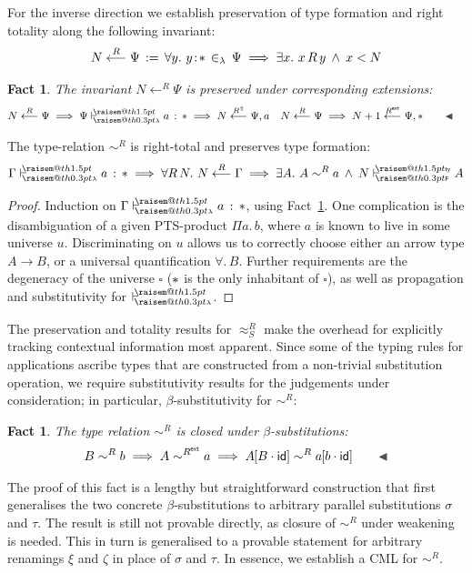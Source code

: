 \documentclass[a4paper,UKenglish]{lipics-v2016}
\makeatletter
\newcommand{\ms}{\,}
\newcommand{\mrel}[1]{\mathrel{\ms #1 \ms}}
\newcommand{\OF}{\mrel{:}}
\newcommand{\mAnd}{\mrel{\wedge}}
\newcommand{\mAll}[1]{\ensuremath{\forall} #1.\ms\ms}
\newcommand{\mEx}[1]{\ensuremath{\exists} #1.\ms\ms}
\newcommand{\eqdef}{\mrel{:=}}
\newcommand{\ty}{\mathsf{ty}}
\newcommand{\of}{\ensuremath{\!:\!}}
\newcommand{\raisemath}[1]{\mathpalette{\raisem@th{#1}}}
\newcommand{\raisem@th}[3]{\raisebox{#1}{\ensuremath{#2#3}}}
\newcommand{\tsAnnot}[2]{\vdash\hspace{-.7em}^{\raisemath{1.5pt}{\scriptscriptstyle{#2}}}_{\raisemath{0.3pt}{\scriptscriptstyle{#1}}}} %
\newcommand{\tfF}{\tsAnnot{\mathsf{F}}{\ty}}  %
\newcommand{\istyF}[2]{\ensuremath{{#1} \mathrel{\tfF} #2}}
\newcommand{\tyL}{\tsAnnot{\lambda}{}} %
\newcommand{\typingL}[3]{\ensuremath{{#1} \mathrel{\tyL} #2 \OF #3}}
\newcommand{\inL}{\mrel{\in_{\lambda}}}
\newcommand{\tyr}{\mathrel{\sim}}
\newcommand{\tmr}{\mathrel{\approx}}
\newcommand{\Rext}[1]{\ensuremath{#1^{\mathsf{ext}}}}
\newcommand{\Rshift}[1]{\ensuremath{#1^{\Uparrow}}}
\newcommand{\tyctxrelLF}[3]{\ensuremath{#1\mathrel{\mathop{\longleftarrow}^{#2}\limits}#3}}
\newcommand{\Prp}{\ensuremath{\textrm{\textasteriskcentered}}}
\newcommand{\Typ}{\ensuremath{\square}}
\newcommand{\All}{\ensuremath{\forall.\,}}
\newcommand{\Prod}[1]{\ensuremath{\Pi #1.\,}}
\newcommand{\subst}[1]{\hphantom{|}\!\![{#1}]}
\newcommand{\scons}{\mathbin{\cdot}}
\newcommand{\id}{\mathsf{id}}
\theoremstyle{plain}
\newtheorem{fact}[theorem]{Fact}
\makeatother
\begin{document}
For the inverse direction we establish preservation of type formation and right totality along the following invariant:
\begin{align*}
  \tyctxrelLF{N}{R}{\Psi} \eqdef \mAll {y} y\of\Prp \inL \Psi \implies \mEx x x\,R\,y \mAnd x < N
\end{align*}
\begin{fact}
  \label{fac:inv-tylf-ext}
  The invariant $\tyctxrelLF{N}{R}{\Psi}$ is preserved under corresponding extensions:
  \begin{align*}
    &\tyctxrelLF{N}{R}{\Psi} \implies \typingL{\Psi}{a}{\Prp} \implies \tyctxrelLF{N}{\Rshift{R}}{\Psi,a} & &\tyctxrelLF{N}{R}{\Psi} \implies \tyctxrelLF{N+1}{\Rext{R}}{\Psi,\Prp}\tag*{\qedsymbol}
  \end{align*}
\end{fact}
\begin{lemma}
  \label{lem:tyr_lf_tot_pres}
  The type-relation $\tyr^R$ is right-total and preserves type formation:
  \begin{align*}
    \typingL{\Gamma}{a}{\Prp} \implies \mAll {R\,N} \tyctxrelLF{N}{R}{\Gamma} \implies \mEx A A \tyr^R a \mAnd \istyF{N}{A}
  \end{align*}
\end{lemma}
\begin{proof}
  Induction on $\typingL{\Gamma}{a}{\Prp}$, using Fact~\ref{fac:inv-tylf-ext}.
  One complication is the disambiguation of a given PTS-product $\Prod{a} b$, where $a$ is known to live in some universe $u$.
  Discriminating on $u$ allows us to correctly choose either an arrow type $A \to B$, or a universal quantification $\All B$.
  Further requirements are the degeneracy of the universe $\Typ$ ($\Prp$ is the only inhabitant of $\Typ$), as well as propagation and substitutivity for $\tyL$.
\end{proof}

The preservation and totality results for $\tmr^R_S$ make the overhead for explicitly tracking contextual information most apparent.
Since some of the typing rules for applications ascribe types that are constructed from a non-trivial substitution operation, we require substitutivity results for the judgements under consideration; in particular, $\beta$-substitutivity for $\tyr^R$:
\begin{fact}
  The type relation $\tyr^R$ is closed under $\beta$-substitutions:
  \begin{align*}
    B \tyr^R b \implies A \tyr^{\Rext{R}} a \implies A\subst{B\scons\id} \tyr^R a\subst{b\scons\id} \tag*{\qedsymbol}
  \end{align*}
\end{fact}
The proof of this fact is a lengthy but straightforward construction that first generalises the two concrete $\beta$-substitutions to arbitrary parallel substitutions $\sigma$ and $\tau$.
The result is still not provable directly, as closure of $\tyr^R$ under weakening is needed.
This in turn is generalised to a provable statement for arbitrary renamings $\xi$ and $\zeta$ in place of $\sigma$ and $\tau$.
In essence, we establish a CML for $\tyr^R$.
\end{document}
